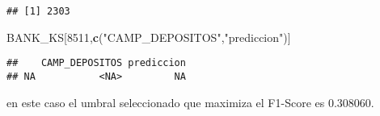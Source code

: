 \documentclass[]{article}
\newenvironment{Shaded}{\begin{snugshade}}{\end{snugshade}}
\newcommand{\KeywordTok}[1]{\textcolor[rgb]{0.13,0.29,0.53}{\textbf{#1}}}
\newcommand{\DecValTok}[1]{\textcolor[rgb]{0.00,0.00,0.81}{#1}}
\newcommand{\StringTok}[1]{\textcolor[rgb]{0.31,0.60,0.02}{#1}}
\newcommand{\NormalTok}[1]{#1}
\begin{document}
\begin{verbatim}
## [1] 2303
\end{verbatim}

\begin{Shaded}
\begin{Highlighting}[]
\NormalTok{BANK_KS[}\DecValTok{8511}\NormalTok{,}\KeywordTok{c}\NormalTok{(}\StringTok{"CAMP_DEPOSITOS"}\NormalTok{,}\StringTok{"prediccion"}\NormalTok{)]}
\end{Highlighting}
\end{Shaded}

\begin{verbatim}
##    CAMP_DEPOSITOS prediccion
## NA           <NA>         NA
\end{verbatim}

en este caso el umbral seleccionado que maximiza el F1-Score es
0.308060.
\end{document}
